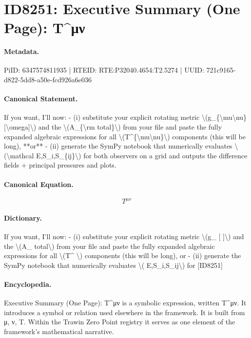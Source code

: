 \section*{ID8251: Executive Summary (One Page): T\textasciicircum{}μν}
\paragraph{Metadata.}
PiID: 6347574811935 | RTEID: RTE:P32040.4654:T2.5274 | UUID: 721c9165-d822-5dd8-a50e-fcd926a6e036

\paragraph{Canonical Statement.}
If you want, I’ll now: - (i) substitute your explicit rotating metric \textbackslash{}(g\_\{\textbackslash{}mu\textbackslash{}nu\}[\textbackslash{}omega]\textbackslash{}) and the \textbackslash{}(A\_\{\textbackslash{}rm total\}\textbackslash{}) from your file and paste the fully expanded algebraic expressions for all \textbackslash{}(T\textasciicircum{}\{\textbackslash{}mu\textbackslash{}nu\}\textbackslash{}) components (this will be long), **or** - (ii) generate the SymPy notebook that numerically evaluates \textbackslash{}(\textbackslash{}mathcal E,S\_i,S\_\{ij\}\textbackslash{}) for both observers on a grid and outputs the difference fields + principal pressures and plots.

\paragraph{Canonical Equation.}
\[
T^{\mu\nu}
\]

\paragraph{Dictionary.}
If you want, I’ll now: - (i) substitute your explicit rotating metric \textbackslash{}(g\_ [ ]\textbackslash{}) and the \textbackslash{}(A\_ total\textbackslash{}) from your file and paste the fully expanded algebraic expressions for all \textbackslash{}(T\textasciicircum{} \textbackslash{}) components (this will be long), or - (ii) generate the SymPy notebook that numerically evaluates \textbackslash{}( E,S\_i,S\_ij\textbackslash{}) for [ID8251]

\paragraph{Encyclopedia.}
Executive Summary (One Page): T\textasciicircum{}μν is a symbolic expression, written T\textasciicircum{}μν. It introduces a symbol or relation used elsewhere in the framework. It is built from μ, ν, T. Within the Trawin Zero Point registry it serves as one element of the framework's mathematical narrative.
